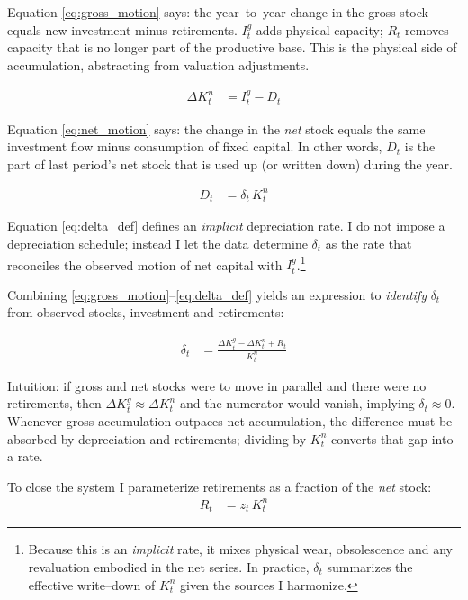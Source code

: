 Equation \eqref{eq:gross_motion} says: the year–to–year change in the gross stock equals new investment minus retirements. $I^g_t$ adds physical capacity; $R_t$ removes capacity that is no longer part of the productive base. This is the physical side of accumulation, abstracting from valuation adjustments.

\begin{align}
\Delta K^n_t &= I^g_t - D_t \tag{2}\label{eq:net_motion}
\end{align}

Equation \eqref{eq:net_motion} says: the change in the \emph{net} stock equals the same investment flow minus consumption of fixed capital. In other words, $D_t$ is the part of last period’s net stock that is used up (or written down) during the year.

\begin{align}
D_t &= \delta_t\, K^n_t \tag{3}\label{eq:delta_def}
\end{align}

Equation \eqref{eq:delta_def} defines an \emph{implicit} depreciation rate. I do not impose a depreciation schedule; instead I let the data determine $\delta_t$ as the rate that reconciles the observed motion of net capital with $I^g_t$.\footnote{Because this is an \emph{implicit} rate, it mixes physical wear, obsolescence and any revaluation embodied in the net series. In practice, $\delta_t$ summarizes the effective write–down of $K^n_t$ given the sources I harmonize.}

Combining \eqref{eq:gross_motion}–\eqref{eq:delta_def} yields an expression to \emph{identify} $\delta_t$ from observed stocks, investment and retirements:

\begin{align}
\delta_t &= \frac{\Delta K^g_t - \Delta K^n_t + R_t}{K^n_t} \tag{4}\label{eq:delta_ident}
\end{align}

Intuition: if gross and net stocks were to move in parallel and there were no retirements, then $\Delta K^g_t \approx \Delta K^n_t$ and the numerator would vanish, implying $\delta_t \approx 0$. Whenever gross accumulation outpaces net accumulation, the difference must be absorbed by depreciation and retirements; dividing by $K^n_t$ converts that gap into a rate.

To close the system I parameterize retirements as a fraction of the \emph{net} stock:
\begin{align}
R_t &= z_t\, K^n_t \tag{5}\label{eq:z_def}
\end{align}

